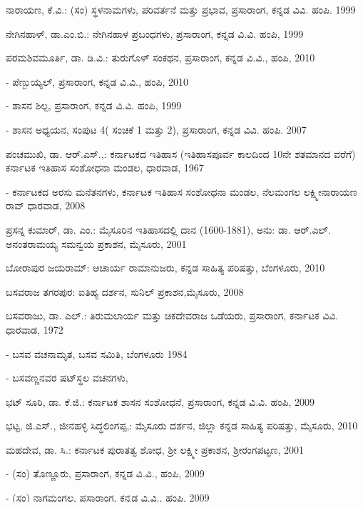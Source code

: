\noindent
ನಾರಾಯಣ, ಕೆ.ವಿ.: (ಸಂ) ಸ್ಥಳನಾಮಗಳು, ಪರಿವರ್ತನೆ ಮತ್ತು ಪ್ರಭಾವ, ಪ್ರಸಾರಾಂಗ, ಕನ್ನಡ ವಿವಿ. ಹಂಪಿ. 1999

\noindent
ನೇಗಿನಹಾಳ್​, ಡಾ.ಎಂ.ಬಿ.: ನೇಗಿನಹಾಳ ಪ್ರಬಂಧಗಳು, ಪ್ರಸಾರಾಂಗ, ಕನ್ನಡ ವಿ.ವಿ. ಹಂಪಿ, 1999

\noindent
ಪರಮಶಿವಮೂರ್ತಿ, ಡಾ. ಡಿ.ವಿ.: ತುರುಗೊಳ್​ ಸಂಕಥನ, ಪ್ರಸಾರಾಂಗ, ಕನ್ನಡ ವಿ.ವಿ., ಹಂಪಿ, 2010

- ಪೆಣ್ಬುಯ್ಯಲ್​, ಪ್ರಸಾರಾಂಗ, ಕನ್ನಡ ವಿ.ವಿ., ಹಂಪಿ, 2010

- ಶಾಸನ ಶಿಲ್ಪ, ಪ್ರಸಾರಾಂಗ, ಕನ್ನಡ ವಿ.ವಿ. ಹಂಪಿ, 1999

- ಶಾಸನ ಅಧ್ಯಯನ, ಸಂಪುಟ 4( ಸಂಚಿಕೆ 1 ಮತ್ತು 2), ಪ್ರಸಾರಾಂಗ, ಕನ್ನಡ ವಿವಿ. ಹಂಪಿ. 2007

\noindent
ಪಂಚಮುಖಿ, ಡಾ. ಆರ್​.ಎಸ್​.,: ಕರ್ನಾಟಕದ ಇತಿಹಾಸ (ಇತಿಹಾಸಪೂರ್ವ ಕಾಲದಿಂದ 10ನೇ ಶತಮಾನದ ವರೆಗೆ) ಕರ್ನಾಟಕ ಇತಿಹಾಸ ಸಂಶೋಧನಾ ಮಂಡಲ, ಧಾರವಾಡ, 1967

- ಕರ್ನಾಟಕದ ಅರಸು ಮನೆತನಗಳು, ಕರ್ನಾಟಕ ಇತಿಹಾಸ ಸಂಶೋಧನಾ ಮಂಡಲ, ನೆಲಮಂಗಲ ಲಕ್ಷ್ಮೀನಾರಾಯಣ ರಾವ್​ ಧಾರವಾಡ, 2008

\noindent
ಪ್ರಸನ್ನ ಕುಮಾರ್​, ಡಾ. ಎಂ.: ಮೈಸೂರಿನ ಇತಿಹಾಸದಲ್ಲಿ ದಾನ (1600-1881), ಅನು: ಡಾ. ಆರ್​.ಎಲ್​. ಅನಂತರಾಮಯ್ಯ ಸಮನ್ವಯ ಪ್ರಕಾಶನ, ಮೈಸೂರು, 2001

\noindent
ಬೋರಾಪುರ ಜಯರಾಮ್: ಆಚಾರ್ಯ ರಾಮಾನುಜರು, ಕನ್ನಡ ಸಾಹಿತ್ಯ ಪರಿಷತ್ತು, ಬೆಂಗಳೂರು, 2010

\noindent
ಬಸವರಾಜ ತಗರಪುರ: ಐತಿಹ್ಯ ದರ್ಶನ, ಸುನಿಲ್​ ಪ್ರಕಾಶನ,ಮೈಸೂರು, 2008

\noindent
ಬಸವರಾಜು, ಡಾ. ಎಲ್​.: ತಿರುಮಲಾರ್ಯ ಮತ್ತು ಚಿಕದೇವರಾಜ ಒಡೆಯರು, ಪ್ರಸಾರಾಂಗ, ಕರ್ನಾಟಕ ವಿವಿ. ಧಾರವಾಡ, 1972

\newpage

- ಬಸವ ವಚನಾಮೃತ, ಬಸವ ಸಮಿತಿ, ಬೆಂಗಳೂರು 1984

- ಬಸವಣ್ಣನವರ ಷಟ್​ಸ್ಥಲ ವಚನಗಳು,

\noindent
ಭಟ್​ ಸೂರಿ, ಡಾ. ಕೆ.ಜಿ.: ಕರ್ನಾಟಕ ಶಾಸನ ಸಂಶೋಧನೆ, ಪ್ರಸಾರಾಂಗ, ಕನ್ನಡ ವಿ.ವಿ. ಹಂಪಿ, 2009

\noindent
ಭಟ್ಟ, ಜಿ.ಎಸ್​., ಜೀನಹಳ್ಳಿ ಸಿದ್ಧಲಿಂಗಪ್ಪ,: ಮೈಸೂರು ದರ್ಶನ, ಜಿಲ್ಲಾ ಕನ್ನಡ ಸಾಹಿತ್ಯ ಪರಿಷತ್ತು, ಮೈಸೂರು, 2010

\noindent
ಮಹದೇವ, ಡಾ. ಸಿ.: ಕರ್ನಾಟಕ ಪುರಾತತ್ವ ಶೋಧ, ಶ‍್ರೀ ಲಕ್ಷ್ಮೀ ಪ್ರಕಾಶನ, ಶ‍್ರೀರಂಗಪಟ್ಟಣ, 2001

- (ಸಂ) ತೊಣ್ಣೂರು, ಪ್ರಸಾರಾಂಗ, ಕನ್ನಡ ವಿ.ವಿ., ಹಂಪಿ, 2009

- (ಸಂ) ನಾಗಮಂಗಲ, ಪ್ರಸಾರಾಂಗ, ಕನ್ನಡ ವಿ.ವಿ., ಹಂಪಿ, 2009

\noindent
ಮಂಜು ಡಾ. ಎಚ್​.: ಮಂಡ್ಯ ತಾಲ್ಲೂಕಿನ ಪಾರಂಪರಿಕ ಕೃಷಿ ತಂತ್ರಜ್ಞಾನ,(ಅಪ್ರಕಟಿತ ಪಿಎಚ್​.ಡಿ. ಪ್ರಬಂಧ), ಮೈಸೂರು ವಿ.ವಿ. 2010

\noindent
ಮಂಜುನಾಥ್​, ಡಾ. ಎಂ.ಜಿ.: ಶಾಸನ ಪರಿಶೋಧನೆ, ಶಾರದಾ ಮಂದಿರ, ಮೈಸೂರು 2008

